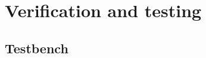 \chapter{Verification and testing}

\section{Testbench}



\begin{code}
    \inputminted{vhdl}{listings/04/CORDIC_tb.vhd}
    \label{code:testbench}
\end{code}
